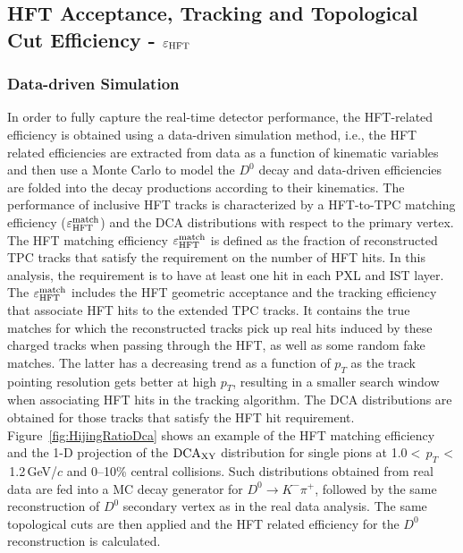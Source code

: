 \documentclass[%
 reprint,	
showpacs,
 amsmath,amssymb,
 aps,
 prc,
]{revtex4-1}
\begin{document}
\subsection{HFT Acceptance, Tracking and Topological Cut Efficiency - $\varepsilon_{\rm HFT}$}
\label{correction:hft}

\subsubsection{Data-driven Simulation} 
\label{correction:hft:fastsim}

In order to fully capture the real-time detector performance, the HFT-related efficiency is obtained using a data-driven simulation method, i.e., the HFT related efficiencies are extracted from data as a function of kinematic variables and then use a Monte Carlo to model the $D^0$ decay and data-driven efficiencies are folded into the decay productions according to their kinematics. The performance of inclusive HFT tracks is characterized by a HFT-to-TPC matching efficiency ($\varepsilon_{\rm HFT}^{\rm match}$) and the DCA distributions with respect to the primary vertex. The HFT matching efficiency $\varepsilon_{\rm HFT}^{\rm match}$ is defined as the fraction of reconstructed TPC tracks that satisfy the requirement on the number of HFT hits. In this analysis, the requirement is to have at least one hit in each PXL and IST layer. The $\varepsilon_{\rm HFT}^{\rm match}$ includes the HFT geometric acceptance and the tracking efficiency that associate HFT hits to the extended TPC tracks. It contains the true matches for which the reconstructed tracks pick up real hits induced by these charged tracks when passing through the HFT, as well as some random fake matches. The latter has a decreasing trend as a function of $p_T$ as the track pointing resolution gets better at high $p_T$, resulting in a smaller search window when associating HFT hits in the tracking algorithm. The DCA distributions are obtained for those tracks that satisfy the HFT hit requirement. Figure~\ref{fig:HijingRatioDca} shows an example of the HFT matching efficiency and the 1-D projection of the $\textup{DCA}_{\textup{XY}}$ distribution for single pions at 1.0$<$\,$p_{T}$\,$<$\,1.2\,GeV/$c$ and 0--10\% central collisions. Such distributions obtained from real data are fed into a MC decay generator for $D^0\rightarrow K^-\pi^+$, followed by the same reconstruction of $D^0$ secondary vertex as in the real data analysis. The same topological cuts are then applied and the HFT related efficiency for the $D^0$ reconstruction is calculated.
\end{document}
